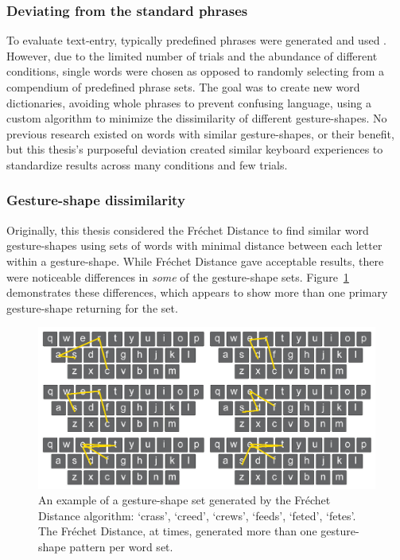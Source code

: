 \subsubsection{Deviating from the standard phrases}
To evaluate text-entry, typically predefined phrases were generated and used \cite{ref_phrase_sets}. However, due to the limited number of trials and the abundance of different conditions, single words were chosen as opposed to randomly selecting from a compendium of predefined phrase sets. The goal was to create new word dictionaries, avoiding whole phrases to prevent confusing language, using a custom algorithm to minimize the dissimilarity of different gesture-shapes. No previous research existed on words with similar gesture-shapes, or their benefit, but this thesis's purposeful deviation created similar keyboard experiences to standardize results across many conditions and few trials.

\subsubsection {Gesture-shape dissimilarity} \label{gesture_shape_dissimilarity}
Originally, this thesis considered the Fr\'echet Distance to find similar word gesture-shapes using sets of words with minimal distance between each letter within a gesture-shape. While Fr\'echet Distance gave acceptable results, there were noticeable differences in \textit{some} of the gesture-shape sets. Figure~\ref{fig_words_frechet} demonstrates these differences, which appears to show more than one primary gesture-shape returning for the set.

\begin{figure}[!b]
	\centering
	\includegraphics[width=5in]{Figures/fig_words_frechet}
	\caption[Fr\'echet Word Set]{An example of a gesture-shape set generated by the Fr\'echet Distance algorithm: `crass', `creed', `crews', `feeds', `feted', `fetes'. The Fr\'echet Distance, at times, generated more than one gesture-shape pattern per word set.}
	\label{fig_words_frechet}
\end{figure}

